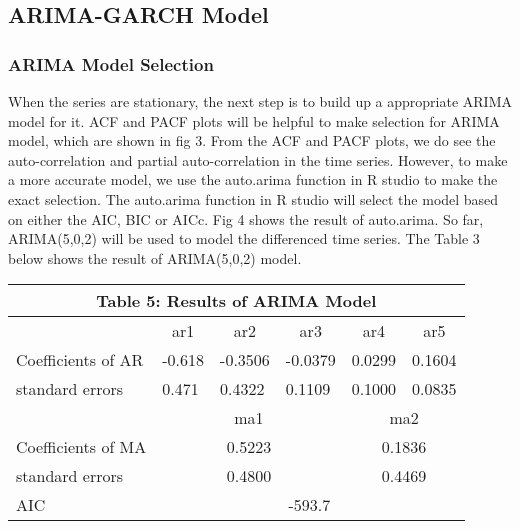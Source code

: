 \subsection{ARIMA-GARCH Model}
\subsubsection{ARIMA Model Selection}

When the series are stationary,  the next step is to build up a appropriate ARIMA model for it. ACF and PACF plots will be helpful to make selection for ARIMA model, which are shown in fig 3. From the ACF and PACF plots,  we do see the auto-correlation and partial auto-correlation in the time series. However, to make a more accurate model, we use the auto.arima function in R studio to make the exact selection. The auto.arima function in R studio will select the model  based on either the AIC, BIC or AICc. Fig 4 shows the result of auto.arima. So far, ARIMA(5,0,2) will be used to model the differenced time series. The Table 3 below shows the result of ARIMA(5,0,2) model. 



\begin{table}[]
\centering
\begin{tabular}{|l|c|c|c|c|c|}
\hline
\multicolumn{6}{|c|}{Table 5: Results of ARIMA Model} \\ \hline
 & ar1 & ar2 & ar3 & ar4 & ar5 \\ \hline
Coefficients of AR & -0.618 & -0.3506 & -0.0379 & 0.0299 & 0.1604 \\ \hline
standard errors & \multicolumn{1}{l|}{0.471} & \multicolumn{1}{l|}{0.4322} & \multicolumn{1}{l|}{0.1109} & \multicolumn{1}{l|}{0.1000} & \multicolumn{1}{l|}{0.0835} \\ \hline
 & \multicolumn{3}{c|}{ma1} & \multicolumn{2}{c|}{ma2} \\ \hline
Coefficients of MA & \multicolumn{3}{c|}{0.5223} & \multicolumn{2}{c|}{0.1836} \\ \hline
standard errors & \multicolumn{3}{c|}{0.4800} & \multicolumn{2}{c|}{0.4469} \\ \hline
AIC & \multicolumn{5}{c|}{-593.7} \\ \hline
\end{tabular}
\end{table}
